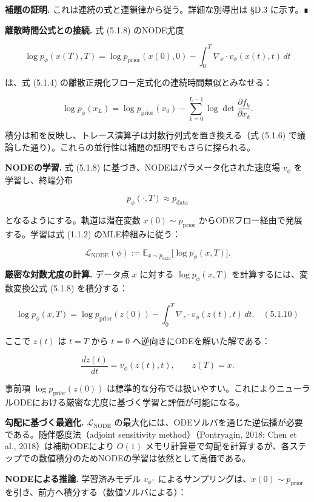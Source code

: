 \textbf{補題の証明.}
これは連続の式と連鎖律から従う。詳細な別導出は §D.3 に示す。∎

\textbf{離散時間公式との接続.} 式 (5.1.8) のNODE尤度

\[
\log p_\phi(x(T), T) = \log p_{\mathrm{prior}}(x(0), 0) - \int_0^T \nabla_x \cdot v_\phi(x(t), t)\, dt
\]


は、式 (5.1.4) の離散正規化フロー定式化の連続時間類似とみなせる：

\[
\log p_\phi(x_L) = \log p_{\mathrm{prior}}(x_0) - \sum_{k=0}^{L-1} \log\det\frac{\partial f_k}{\partial x_k}.
\]


積分は和を反映し、トレース演算子は対数行列式を置き換える（式 (5.1.6) で議論した通り）。これらの並行性は補題の証明でもさらに探られる。

\textbf{NODEの学習.} 式 (5.1.8) に基づき、NODEはパラメータ化された速度場 $v_\phi$ を学習し、終端分布

\[
p_\phi(\cdot, T) \approx p_{\mathrm{data}}
\]


となるようにする。軌道は潜在変数 $x(0) \sim p_{\mathrm{prior}}$ からODEフロー経由で発展する。学習は式 (1.1.2) のMLE枠組みに従う：

\[
\mathcal{L}_{\mathrm{NODE}}(\phi) := \mathbb{E}_{x\sim p_{\mathrm{data}}}\bigl[\log p_\phi(x, T)\bigr].
\]


\textbf{厳密な対数尤度の計算.} データ点 $x$ に対する $\log p_\phi(x, T)$ を計算するには、変数変換公式 (5.1.8) を積分する：

\[
\log p_\phi(x, T) = \log p_{\mathrm{prior}}(z(0)) - \int_0^T \nabla_z \cdot v_\phi(z(t), t)\, dt. \quad (5.1.10)
\]


ここで $z(t)$ は $t=T$ から $t=0$ へ逆向きにODEを解いた解である：

\[
\frac{dz(t)}{dt} = v_\phi(z(t), t), \qquad z(T) = x.
\]


事前項 $\log p_{\mathrm{prior}}(z(0))$ は標準的な分布では扱いやすい。これによりニューラルODEにおける厳密な尤度に基づく学習と評価が可能になる。

\textbf{勾配に基づく最適化.} $\mathcal{L}_{\mathrm{NODE}}$ の最大化には、ODEソルバを通じた逆伝播が必要である。随伴感度法（adjoint sensitivity method）（Pontryagin, 2018; Chen et al., 2018）は補助ODEにより $O(1)$ メモリ計算量で勾配を計算するが、各ステップでの数値積分のためNODEの学習は依然として高価である。

\textbf{NODEによる推論.} 学習済みモデル $v_{\phi^\times}$ によるサンプリングは、$x(0) \sim p_{\mathrm{prior}}$ を引き、前方へ積分する（数値ソルバによる）：

